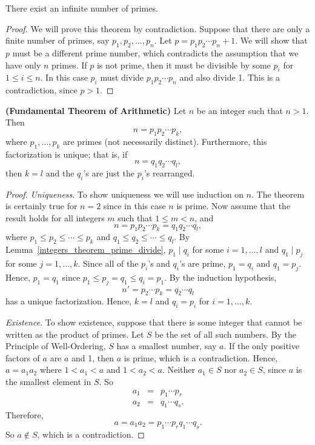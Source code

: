 \begin{theorem}[Euclid]\label{integers_theorem_inifinite_primes}
There exist an infinite number of primes.
\end{theorem}

\begin{proof}
We will prove this theorem by contradiction.  Suppose that there are only a finite number of primes, say $p_1, p_2, \ldots, p_n$.  Let $p = p_1  p_2  \cdots  p_n + 1$.  We will show that $p$ must be a different prime number, which contradicts the assumption that we have only $n$ primes.  If $p$ is not prime, then it must be divisible by some $p_i$ for $1 \leq i \leq n$. In this  case $p_i$ must divide $p_1 p_2 \cdots p_n$ and also divide 1.  This is a contradiction, since $p > 1$. 
\end{proof}

\begin{theorem} {\bf (Fundamental Theorem of Arithmetic)} \label{integers_theorem_FTA}
Let $n$ be an integer such that $n > 1$.  Then
$$
n = p_1 p_2 \cdots p_k,
$$
where $p_1, \ldots, p_k$ are  primes (not necessarily distinct).  Furthermore, this factorization is unique; that is, if 
$$
n = q_1 q_2 \cdots q_l,
$$
then $k = l$ and the $q_i$'s are just the $p_i$'s rearranged.
\end{theorem}

\begin{proof}
{\em Uniqueness}.
To show uniqueness we will use induction on $n$. The theorem is certainly true for $n = 2$ since in this case $n$ is prime.  Now assume that the result holds for all integers $m$ such that $1 \leq m < n$, and 
$$
n = p_1 p_2 \cdots p_k = q_1 q_2 \cdots q_l,
$$
where $p_1 \leq p_2 \leq \cdots \leq p_k$ and $q_1 \leq q_2 \leq \cdots \leq q_l$. By Lemma~\ref{integers_theorem_prime_divide}, $p_1  \mid  q_i$ for some $i = 1, \ldots, l$ and $q_1  \mid  p_j$ for some $j = 1, \ldots, k$.  Since all of the $p_i$'s and $q_i$'s are prime, $p_1 = q_i$ and  $q_1 = p_j$. Hence, $p_1 = q_1$ since $p_1 \leq p_j = q_1 \leq q_i = p_1$.  By the induction hypothesis, 
$$
n' = p_2 \cdots p_k = q_2 \cdots q_l
$$
has a unique factorization.  Hence, $k=l$ and $q_i = p_i$ for $i = 1, \ldots, k$. 

{\em Existence}.
To show existence, suppose that there is some integer that cannot be written as the product of primes.  Let $S$ be the set of all such numbers.  By the Principle of Well-Ordering, $S$ has a smallest number, say $a$.  If the only positive factors of $a$ are $a$ and 1, then $a$ is prime, which is a contradiction.  Hence, $a = a_1 a_2$ where $1 < a_1 < a$ and $1 < a_2 < a$.  Neither $a_1\in S$ nor $a_2 \in S$, since $a$ is the smallest element in $S$.  So 
\begin{eqnarray*}
a_1 & = & p_1 \cdots p_r \\
a_2 & = & q_1 \cdots q_s.
\end{eqnarray*}
Therefore,
$$
a = a_1 a_2 = p_1 \cdots p_r q_1 \cdots q_s.
$$
So $a \notin S$, which is a contradiction.
\end{proof}
 
